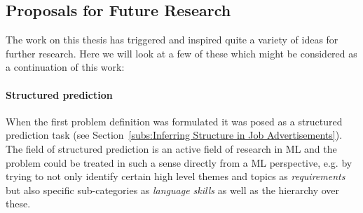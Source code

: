 %
%

\subsection*{Proposals for Future Research}
\label{sub:further-research}

The work on this thesis has triggered and inspired quite a variety of ideas for further research. Here we will look at a few of these which might be considered as a continuation of this work:

\paragraph{Structured prediction} When the first problem definition was formulated it was posed as a structured prediction task (see Section~\ref{subs:Inferring Structure in Job Advertisements}). The field of structured prediction is an active field of research in \gls{ML} and the problem could be treated in such a sense directly from a \acrfull{ML} perspective, e.g. by trying to not only identify certain high level themes and topics as \emph{requirements} but also specific sub-categories as \emph{language skills} as well as the hierarchy over these.
